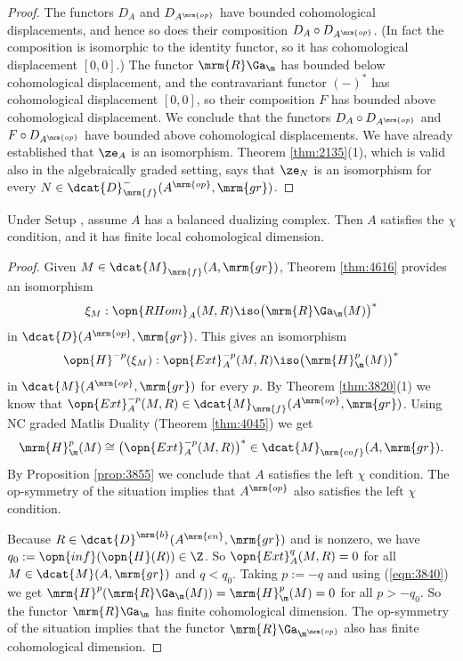 \begin{proof}
The functors $D_{A}$ and $D_{A^{\mrm{op}}}$ have bounded cohomological 
displacements, and hence so does their composition 
$D_{A} \circ D_{A^{\mrm{op}}}$. (In fact the composition is isomorphic to the 
identity functor, so it has cohomological displacement $[0, 0]$.) 
The functor $\mrm{R} \Ga_{\m}$ has bounded below 
cohomological displacement, and the contravariant functor $(-)^*$ has 
cohomological displacement $[0, 0]$, so their composition $F$ has 
bounded above cohomological displacement.
We conclude that the functors 
$D_{A} \circ D_{A^{\mrm{op}}}$ and $F \circ D_{A^{\mrm{op}}}$ have 
bounded above cohomological displacements.
We have already established that $\ze_A$ is an isomorphism. 
Theorem \ref{thm:2135}(1), which is valid also in the algebraically graded 
setting, says that $\ze_N$ is an isomorphism for every 
$N \in \dcat{D}^{-}_{\mrm{f}}(A^{\mrm{op}}, \mrm{gr})$.
\end{proof}

\begin{cor} \label{cor:4655}  
Under Setup \tup{\ref{setup:3925}}, assume $A$ has a balanced dualizing 
complex. Then $A$ satisfies the $\chi$ condition, and it has finite local
cohomological dimension. 
\end{cor}

\begin{proof}
Given $M \in \dcat{M}_{\mrm{f}}(A, \mrm{gr})$, Theorem \ref{thm:4616}
provides an isomorphism 
\[ \xi_M : \opn{RHom}_A(M, R) \iso \bigl( \mrm{R} \Ga_{\m}(M) \bigr)^* \] 
in $\dcat{D}(A^{\mrm{op}}, \mrm{gr})$. 
This gives an isomorphism 
\begin{equation} \label{eqn:4655}
\opn{H}^{-p}(\xi_M) : \opn{Ext}^{-p}_A(M, R) \iso \bigl( \mrm{H}^p_{\m}(M) 
\bigr)^* 
\end{equation}
in $\dcat{M}(A^{\mrm{op}}, \mrm{gr})$
for every $p$. By Theorem \ref{thm:3820}(1) we know that 
$\opn{Ext}^{-p}_A(M, R) \in \dcat{M}_{\mrm{f}}(A^{\mrm{op}}, \mrm{gr})$.
Using NC graded Matlis Duality (Theorem \ref{thm:4045})  we get
\begin{equation} \label{eqn:3840}
\mrm{H}^p_{\m}(M) \cong \bigl( \opn{Ext}^{-p}_A(M, R) \bigr)^* \in 
\dcat{M}_{\mrm{cof}}(A, \mrm{gr}) . 
\end{equation}
By Proposition \ref{prop:3855} we conclude that $A$ satisfies the left $\chi$ 
condition. The op-symmetry of the situation implies that $A^{\mrm{op}}$ also 
satisfies the left $\chi$ condition. 

Because $R \in \dcat{D}^{\mrm{b}}(A^{\mrm{en}}, \mrm{gr})$
and is nonzero, we have 
$q_0 := \opn{inf}(\opn{H}(R)) \in \Z$. 
So $\opn{Ext}^{q}_A(M, R) = 0$
for all $M \in \dcat{M}(A, \mrm{gr})$ and $q < q_0$.
Taking $p := -q$ and using (\ref{eqn:3840}) we get 
$\mrm{H}^p(\mrm{R} \Ga_{\m}(M)) = \mrm{H}^p_{\m}(M) = 0$
for all $p > -q_0$. So the functor $\mrm{R} \Ga_{\m}$ has finite 
cohomological dimension. The op-symmetry of the situation implies that the 
functor $\mrm{R} \Ga_{\m^{\mrm{op}}}$ also has finite cohomological 
dimension.
\end{proof}

